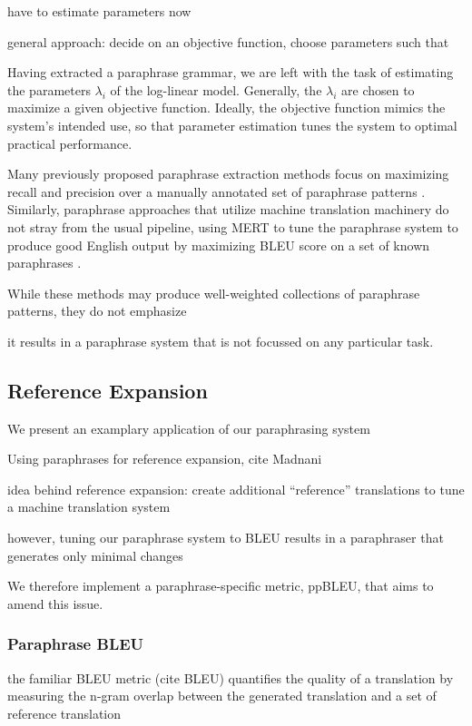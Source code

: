 \documentclass[11pt]{article}
\newcommand{\mnote}[1]{\marginpar{%
  \vskip-\baselineskip
  \raggedright\footnotesize
  \itshape\hrule\smallskip\tiny{#1}\par\smallskip\hrule}}
\begin{document}
have to estimate parameters now

general approach: decide on an objective function, choose parameters
such that

Having extracted a paraphrase grammar, we are left with the task of
estimating the parameters $\lambda_i$ of the log-linear
model. Generally, the $\lambda_i$ are chosen to maximize a given
objective function. Ideally, the objective function mimics the
system's intended use, so that parameter estimation tunes the system
to optimal practical performance.

Many previously proposed paraphrase extraction methods focus on
maximizing recall and precision over a manually annotated set of
paraphrase patterns \cite{Zhao2008,Bhagat2008}.  Similarly, paraphrase
approaches that utilize machine translation machinery do not stray
from the usual pipeline, using MERT \cite{Och2003} to tune the
paraphrase system to produce good English output by maximizing BLEU
score on a set of known paraphrases \cite{Madnani2007}.

While these methods may produce well-weighted collections of
paraphrase patterns, they do not emphasize 

it results in a paraphrase system that is not
focussed on any particular task.



\subsection{Reference Expansion}

We present an examplary application of our paraphrasing system

Using paraphrases for reference expansion, cite Madnani

idea behind reference expansion: create additional ``reference''
translations to tune a machine translation system

however, tuning our paraphrase system to BLEU results in a paraphraser
that generates only minimal changes \mnote{if so, how did Madnani deal
with that?}

We therefore implement a paraphrase-specific metric, ppBLEU, that aims
to amend this issue.

\subsubsection{Paraphrase BLEU} \label{pp_bleu}

the familiar BLEU metric (cite BLEU) quantifies the quality of a
translation by measuring the n-gram overlap between the generated
translation and a set of  reference translation
\end{document}

